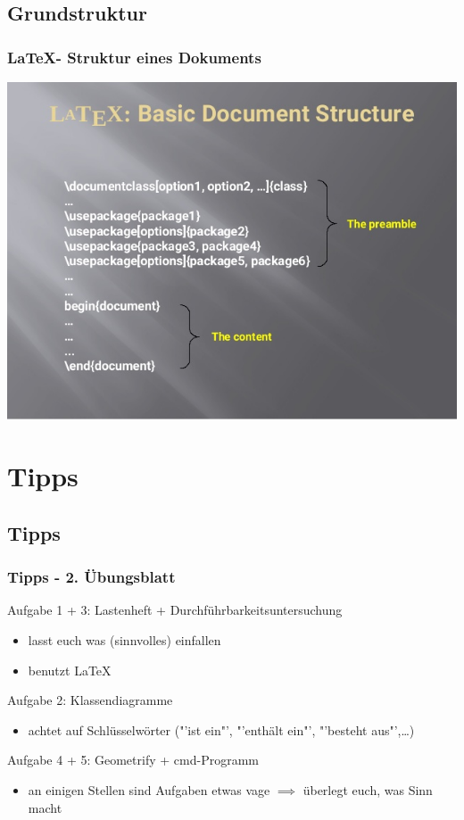 \documentclass[18pt]{beamer}
\begin{document}
	\subsection{Grundstruktur}
	\begin{frame}
		\frametitle{\LaTeX - Struktur eines Dokuments}
		\includegraphics[scale=0.48]{./pics/tut1/latex.jpg}
	\end{frame}
		
\section{Tipps}
	\subsection{Tipps}
	\begin{frame}
		\frametitle{Tipps - 2. Übungsblatt}
		\begin{small}
			\begin{exampleblock}{Aufgabe 1 + 3: Lastenheft + Durchführbarkeitsuntersuchung}
				\begin{itemize}
					\item lasst euch was (sinnvolles) einfallen
					\item benutzt \LaTeX
				\end{itemize}
			\end{exampleblock}
			\pause
			\begin{exampleblock}{Aufgabe 2: Klassendiagramme}
				\begin{itemize}
					\item achtet auf Schlüsselwörter ("'ist ein"', "'enthält ein"', "'besteht aus"',\dots)
				\end{itemize}
			\end{exampleblock}
			\pause
			\begin{exampleblock}{Aufgabe 4 + 5: Geometrify + cmd-Programm}
				\begin{itemize}
					\item an einigen Stellen sind Aufgaben etwas vage
					\linebreak $\implies$ überlegt euch, was Sinn macht
				\end{itemize}
			\end{exampleblock}
		\end{small}
	\end{frame}
	
\end{document}
